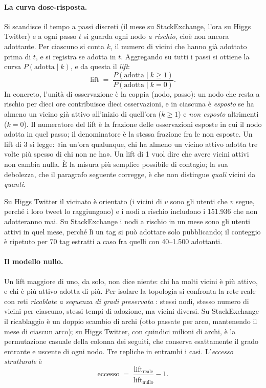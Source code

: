 \documentclass[11pt,a4paper]{article}
\newcommand{\sx}{StackExchange}
\newcommand{\hg}{Higgs Twitter}
\begin{document}
\paragraph{La curva dose-risposta.} Si scandisce il tempo a passi discreti (il mese su \sx{}, l'ora su \hg{}) e a ogni passo $t$ si guarda ogni nodo \emph{a rischio}, cioè non ancora adottante. Per ciascuno si conta $k$, il numero di vicini che hanno già adottato prima di $t$, e si registra se adotta in $t$. Aggregando su tutti i passi si ottiene la curva $P(\text{adotta} \mid k)$, e da questa il \emph{lift}:
\begin{equation}
  \mathrm{lift} \;=\; \frac{P(\text{adotta} \mid k \ge 1)}{P(\text{adotta} \mid k = 0)} .
\end{equation}
In concreto, l'unità di osservazione è la coppia (nodo, passo): un nodo che resta a rischio per dieci ore contribuisce dieci osservazioni, e in ciascuna è \emph{esposto} se ha almeno un vicino già attivo all'inizio di quell'ora ($k \ge 1$) e \emph{non esposto} altrimenti ($k = 0$). Il numeratore del lift è la frazione delle osservazioni esposte in cui il nodo adotta in quel passo; il denominatore è la stessa frazione fra le non esposte. Un lift di 3 si legge: «in un'ora qualunque, chi ha almeno un vicino attivo adotta tre volte più spesso di chi non ne ha». Un lift di 1 vuol dire che avere vicini attivi non cambia nulla. È la misura più semplice possibile di contagio; la sua debolezza, che il paragrafo seguente corregge, è che non distingue \emph{quali} vicini da \emph{quanti}.

Su \hg{} il vicinato è orientato (i vicini di $v$ sono gli utenti che $v$ segue, perché i loro tweet lo raggiungono) e i nodi a rischio includono i 151.936 che non adotteranno mai. Su \sx{} i nodi a rischio in un mese sono gli utenti attivi in quel mese, perché lì un tag si può adottare solo pubblicando; il conteggio è ripetuto per 70 tag estratti a caso fra quelli con 40--1.500 adottanti.

\paragraph{Il modello nullo.} Un lift maggiore di uno, da solo, non dice niente: chi ha molti vicini è più attivo, e chi è più attivo adotta di più. Per isolare la topologia si confronta la rete reale con reti \emph{ricablate a sequenza di gradi preservata} \citep{maslov2002}: stessi nodi, stesso numero di vicini per ciascuno, stessi tempi di adozione, ma vicini diversi. Su \sx{} il ricablaggio è un doppio scambio di archi (otto passate per arco, mantenendo il mese di ciascun arco); su \hg{}, con quindici milioni di archi, è la permutazione casuale della colonna dei seguiti, che conserva esattamente il grado entrante e uscente di ogni nodo. Tre repliche in entrambi i casi. L'\emph{eccesso strutturale} è
\begin{equation}
  \mathrm{eccesso} \;=\; \frac{\mathrm{lift}_{\mathrm{reale}}}{\overline{\mathrm{lift}}_{\mathrm{nullo}}} - 1 .
\end{equation}
\end{document}
